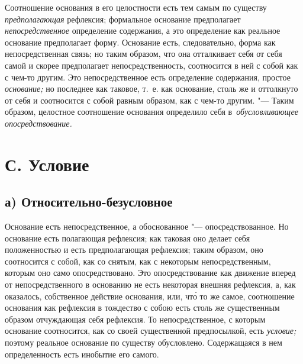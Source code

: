 Соотношение основания в его целостности есть тем самым по существу
{\em предполагающая} рефлексия; формальное основание
предполагает {\em непосредственное} определение
содержания, а это определение как реальное основание предполагает форму.
Основание есть, следовательно, форма как непосредственная связь; но таким
образом, что она отталкивает себя от себя самой и скорее предполагает
непосредственность, соотносится в ней с собой как с чем-то другим. Это
непосредственное есть определение содержания, простое
{\em основание;} но последнее как таковое, т.~е. как
основание, столь же и оттолкнуто от себя и соотносится с собой равным
образом, как с чем-то другим. "--- Таким образом, целостное соотношение
основания определило себя в~{\em обусловливающее опосредствование.}

\section[С. Условие]{С. Условие}

\subsection[а) Относительно-безусловное]{а) Относительно-безусловное}

Основание есть непосредственное, а обоснованное
"--- опосредствованное. Но основание есть полагающая рефлексия; как таковая
оно делает себя положенностью и есть предполагающая рефлексия; таким
образом, оно соотносится с собой, как со снятым, как с некоторым
непосредственным, которым оно само опосредствовано. Это опосредствование
как движение вперед от непосредственного в основанию не есть некоторая
внешняя рефлексия, а, как оказалось, собственное действие основания, или,
чт\'{о} то же самое, соотношение основания как рефлексия в тождество с собою
есть столь же существенным образом отчуждающая себя рефлексия. То
непосредственное, с которым основание соотносится, как со своей
существенной предпосылкой, есть {\em условие;} поэтому
реальное основание по существу обусловлено. Содержащаяся в нем
определенность есть инобытие его самого.

